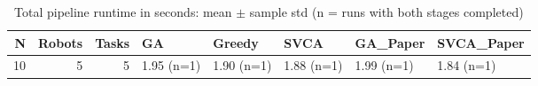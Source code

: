 \begin{table}[htbp]
\centering
\small
\caption{Total pipeline runtime in seconds: mean $\pm$ sample std (n = runs with both stages completed)}
\label{tab:research_smoke_c1_r1_20261122_total_runtime}
\begin{tabular}{rrrlllll}
\hline
N & Robots & Tasks & GA & Greedy & SVCA & GA\_Paper & SVCA\_Paper \\
\hline
10 & 5 & 5 & 1.95 (n=1) & 1.90 (n=1) & 1.88 (n=1) & 1.99 (n=1) & 1.84 (n=1) \\
\hline
\end{tabular}
\end{table}
